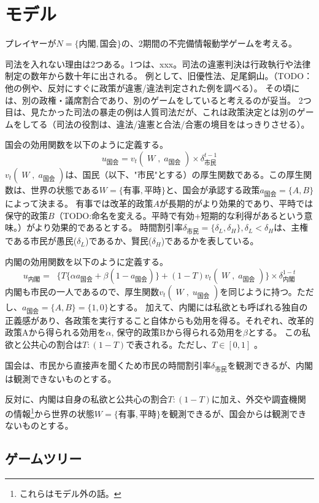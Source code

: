 \documentclass[main.tex]{subfiles}
\begin{document}
\section{モデル}

プレイヤーが$N=\lbrace 内閣, 国会 \rbrace$の、2期間の不完備情報動学ゲームを考える。



司法を入れない理由は2つある。1つは、xxx。司法の違憲判決は行政執行や法律制定の数年から数十年に出される。
例として、旧優性法、足尾銅山。（TODO：他の例や、反対にすぐに政策が違憲/違法判定された例を調べる）。
その頃には、別の政権・議席割合であり、別のゲームをしていると考えるのが妥当。
2つ目は、見たかった司法の暴走の例は人質司法だが、これは政策決定とは別のゲームをしてる（司法の役割は、違法/違憲と合法/合憲の境目をはっきりさせる）。


国会の効用関数を以下のように定義する。
$$u_\text{国会} = v_t(\;W\;,\; a_\text{国会}\;) × \delta^{t-1}_\text{市民}$$
$v_t(\;W\;,\; a_\text{国会}\;)$は、国民（以下、"市民"とする）の厚生関数である。この厚生関数は、世界の状態である$W=\lbrace 有事, 平時\rbrace$と、国会が承認する政策$a_{国会}=\lbrace A, B\rbrace$によって決まる。
有事では改革的政策$A$が長期的がより効果的であり、平時では保守的政策$B$（TODO:命名を変える。平時で有効+短期的な利得があるという意味。）がより効果的であるとする。
時間割引率$\delta_{市民}=\lbrace \delta_L, \delta_H \rbrace, \delta_L<\delta_H$は、主権である市民が愚民($\delta_L$)であるか、賢民($\delta_H$)であるかを表している。

内閣の効用関数を以下のように定義する。
$$ u_\text{内閣} =\;\; \lbrace T\lbrace \alpha a_\text{国会} + \beta (1-a_\text{国会}) \rbrace  + (1-T)v_t(\;W\;,\; a_\text{国会}\;) \rbrace × \delta^{1-t}_{内閣}$$
内閣も市民の一人であるので、厚生関数$v_t(\;W\;,\; u_\text{国会}\;)$を同じように持つ。ただし、$a_{国会}=\lbrace A, B\rbrace = \lbrace 1,0\rbrace$とする。
加えて、内閣には私欲とも呼ばれる独自の正義感があり、各政策を実行すること自体からも効用を得る。それぞれ、改革的政策Aから得られる効用を$\alpha$, 保守的政策Bから得られる効用を$\beta$とする。
この私欲と公共心の割合は$T:(1-T)$で表される。ただし、$T\in[0,1]$ 。

国会は、市民から直接声を聞くため市民の時間割引率$\delta_{市民}$を観測できるが、内閣は観測できないものとする。

反対に、内閣は自身の私欲と公共心の割合$T:(1-T)$に加え、外交や調査機関の情報\footnote{これらはモデル外の話。}から世界の状態$W=\lbrace 有事, 平時\rbrace$を観測できるが、国会からは観測できないものとする。


\subsection*{ゲームツリー}
\end{document}
